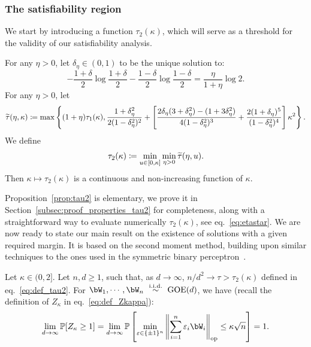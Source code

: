 \subsubsection{The satisfiability region}

We start by introducing a function $\tau_2(\kappa)$, which will serve as a threshold for the validity of our satisfiability analysis.
\begin{proposition}\label{prop:tau2}
   For any $\eta > 0$, let $\delta_\eta \in (0,1)$ to be the unique solution to:
    \begin{equation}
        \label{eq:def_delta_eta}
        - \frac{1+\delta}{2} \log \frac{1+\delta}{2} - \frac{1-\delta}{2} \log \frac{1-\delta}{2} = \frac{\eta}{1+\eta} \log 2.  
    \end{equation}
    For any $\eta > 0$, let 
    \begin{equation}
        \label{eq:def_ttau}
        {\widetilde{\tau}}(\eta,\kappa) \coloneqq \max\left\{(1+\eta) \tau_1(\kappa), \frac{1+\delta_{\eta}^2}{2(1-\delta_{\eta}^2)^2}
      + \left[\frac{2 \delta_{\eta} (3+\delta_{\eta}^2) - (1+3 \delta_\eta^2)}{4(1-\delta_{\eta}^2)^3} + \frac{2(1+\delta_{\eta})^5}{(1-\delta_{\eta}^2)^4}\right] \kappa^2\right\}.
    \end{equation}
    We define
    \begin{equation}
        \label{eq:def_tau2}
        \tau_2(\kappa) \coloneqq \min_{u \in [0,\kappa]} \min_{\eta > 0} {\widetilde{\tau}}(\eta, u).
    \end{equation}
    Then $\kappa \mapsto \tau_2(\kappa)$ is a continuous and non-increasing function of $\kappa$.
\end{proposition}
\noindent
Proposition~\ref{prop:tau2} is elementary, we prove it in Section~\ref{subsec:proof_properties_tau2} for completeness, along 
with a straightforward way to evaluate numerically $\tau_2(\kappa)$, see eq.~\eqref{eq:etastar}.
We are now ready to state our main result on the existence of solutions with a given required margin.
It is based on the second moment method, building upon similar techniques to the ones used in the symmetric binary perceptron~\citep{aubin2019storage}.
\begin{theorem}\label{thm:second_moment}
    Let $\kappa \in (0, 2]$. 
    Let $n,d \geq 1$, such that, as $d \to \infty$, $n/d^2 \to \tau > \tau_2(\kappa)$ defined in eq.~\eqref{eq:def_tau2}. 
    For $\bW_1, \cdots, \bW_n~\iid~\GOE(d)$, we have (recall the definition of $Z_\kappa$ in eq.~\eqref{eq:def_Zkappa}):
    \begin{equation*}
        \lim_{d \to \infty} \bbP[Z_\kappa \geq 1] = \lim_{d \to \infty} \bbP\left[\min_{\eps \in \{\pm 1\}^n} \left\|\sum_{i=1}^n \eps_i \bW_i \right\|_\op \leq \kappa \sqrt{n}\right] = 1.
    \end{equation*} 
\end{theorem}

